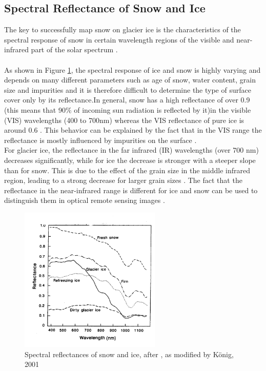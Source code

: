 \documentclass[12pt]{article}
\begin{document}
\subsection{Spectral Reflectance of Snow and Ice}
The key to successfully map snow on glacier ice is the characteristics of the spectral response of snow in certain wavelength regions of the visible and near-infrared part of the solar spectrum \cite{Koenig2001}.  \\
\\
As shown in Figure \ref{fig:reflectance_ice}, the spectral response of ice and snow is highly varying and depends on many different parameters such as age of snow, water content, grain size and impurities and it is therefore difficult to determine the type of surface cover only by its reflectance.In general, snow has a high reflectance of over 0.9 (this means that 90\% of incoming sun radiation is reflected by it)in the visible (VIS) wavelengths (400 to 700nm) whereas the VIS reflectance of pure ice is around 0.6 \cite{ZengQunzhu1984}. This behavior can be explained by the fact that in the VIS range the reflectance is mostly influenced by impurities on the surface \cite{Warren1980a}.\\
For glacier ice, the reflectance in the far infrared (IR) wavelengths (over 700 nm) decreases significantly, while for ice the decrease is stronger with a steeper slope than for snow. This is due to the effect of the grain size in the middle infrared region, leading to a strong decrease for larger grain sizes \cite{Wiscombe1980}. 
The fact that the reflectance in the near-infrared range is different for ice and snow can be used to distinguish them in optical remote sensing images \cite{Dietz2011}.\\
\begin{figure}
\centering 
    \includegraphics[width=0.6\textwidth]{zeng_et_al__as_modified_by_koenig_spectral_reflectance.png}
    \caption{Spectral reflectances of snow and ice, after \cite{ZengQunzhu1984}, as modified by König, 2001 }
    \label{fig:reflectance_ice}
\end{figure}
\end{document}
